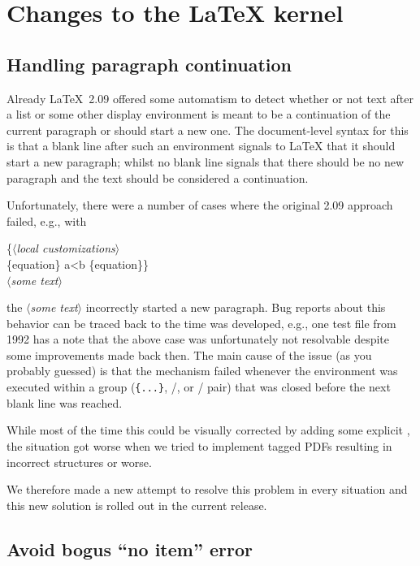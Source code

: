 \documentclass{ltnews}
\providecommand\meta[1]{$\langle$\textrm{\itshape#1}$\rangle$}
\begin{document}
\section{Changes to the \LaTeX{} kernel}

\subsection{Handling paragraph continuation}

Already \LaTeX~2.09 offered some automatism to detect whether or not
text after a list or some other display environment is meant to be a
continuation of the current paragraph or should start a new one.  The
document-level syntax for this is that a blank line after such an
environment signals to \LaTeX{} that it should start a new paragraph;
whilst no blank line signals that there should be no new paragraph and
the text should be considered a continuation.

Unfortunately, there were a number of cases where the original 2.09
approach failed, e.g., with
\begin{flushleft}
  \ttfamily
\{\meta{local customizations}\\
\{equation\} a<b \{equation\}\} \\
\meta{some text}
\end{flushleft}
the \meta{some text} incorrectly started a new paragraph.  Bug reports
about this behavior can be traced back to the time \LaTeXe{} was
developed, e.g., one test file from 1992 has a note that the above
case was unfortunately not resolvable despite some improvements made
back then.  The main cause of the issue (as you probably guessed) is
that the mechanism failed whenever the environment was executed within
a group (\texttt{\{...\}}, /, or
/ pair) that was closed before the next blank
line was reached.

While most of the time this could be visually corrected by adding some
explicit , the situation got worse when we tried to
implement tagged PDFs resulting in incorrect structures or worse.

We therefore made a new attempt to resolve this problem in every
situation and this new solution is rolled out in the current release.


\subsection{Avoid bogus \enquote{no item} error}
\end{document}
